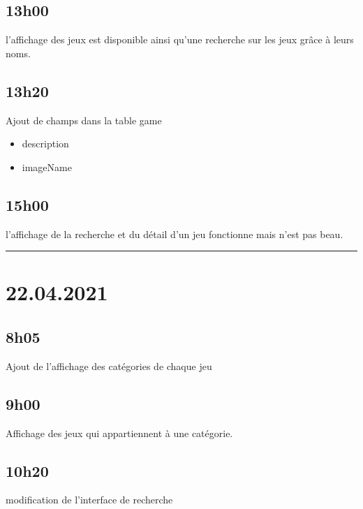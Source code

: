 \documentclass[a4paper,12pt,french]{sphinxmanual}
\begin{document}
\subsection{13h00}
\label{\detokenize{logbook:h00}}
\sphinxAtStartPar
l’affichage des jeux est disponible ainsi qu’une recherche sur les jeux grâce à leurs noms.


\subsection{13h20}
\label{\detokenize{logbook:id11}}
\sphinxAtStartPar
Ajout de champs dans la table game
\begin{itemize}
\item {} 
\sphinxAtStartPar
description

\item {} 
\sphinxAtStartPar
imageName

\end{itemize}


\subsection{15h00}
\label{\detokenize{logbook:id12}}
\sphinxAtStartPar
l’affichage de la recherche et du détail d’un jeu fonctionne mais n’est pas beau.


\bigskip\hrule\bigskip



\section{22.04.2021}
\label{\detokenize{logbook:id13}}

\subsection{8h05}
\label{\detokenize{logbook:id14}}
\sphinxAtStartPar
Ajout de l’affichage des catégories de chaque jeu


\subsection{9h00}
\label{\detokenize{logbook:id15}}
\sphinxAtStartPar
Affichage des jeux qui appartiennent à une catégorie.


\subsection{10h20}
\label{\detokenize{logbook:id16}}
\sphinxAtStartPar
modification de l’interface de recherche
\end{document}
